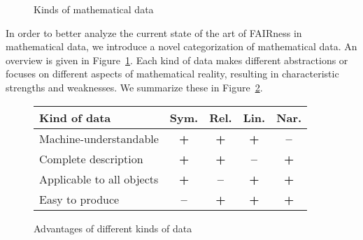 \begin{figure}[ht]\centering
\caption{Kinds of mathematical data}\label{fig:mathematical-data}
\end{figure}

In order to better analyze the current state of the art of FAIRness in mathematical data, we introduce a novel categorization of mathematical data.
An overview is given in Figure~\ref{fig:mathematical-data}.
Each kind of data makes different abstractions or focuses on different aspects of mathematical reality, resulting in characteristic strengths and weaknesses.
We summarize these in Figure~\ref{fig:datakinds}.

\begin{figure}[hbt]\centering\footnotesize
\begin{tabular}{|p{3.5cm}|cccc|}\hline
Kind of data & Sym. & Rel. & Lin. & Nar.\\\hline
Machine-understandable  & \textbf{+} & \textbf{+} & \textbf{+}& \textbf{--}\\
Complete description & \textbf{+} & \textbf{+} & \textbf{--}& \textbf{+}\\
Applicable to all objects & \textbf{+} & \textbf{--} & \textbf{+}& \textbf{+}\\
Easy to produce  & \textbf{--} & \textbf{+} & \textbf{+}& \textbf{+}\\
\hline
\end{tabular}
\caption{Advantages of different kinds of data}\label{fig:datakinds}
\end{figure}


